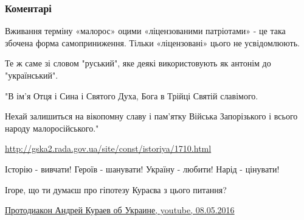  
 
 
 
 
\subsubsection{Коментарі}

\begin{itemize} %
Вживання терміну «малорос» оцими «ліцензованими патріотами» - це така збочена форма самоприниження. Тільки «ліцензовані» цього не усвідомлюють.

Те ж саме зі словом "руський", яке деякі використовують як антонім до "український".


"В ім'я Отця і Сина і Святого Духа, Бога в Трійці Святій славімого.

Нехай залишиться на вікопомну славу і пам'ятку Війська Запорізького і всього
народу малоросійського." 

\url{http://gska2.rada.gov.ua/site/const/istoriya/1710.html}

Історію - вивчати!
Героїв - шанувати!
Україну - любити!
Нарід - цінувати!

Ігоре, що ти думаєш про гіпотезу Кураєва з цього питання?

\href{https://www.youtube.com/watch?v=8ehI9YcuRoU}{%
Протодиакон Андрей Кураев об Украине, youtube, 08.05.2016%
}

\end{itemize} %

